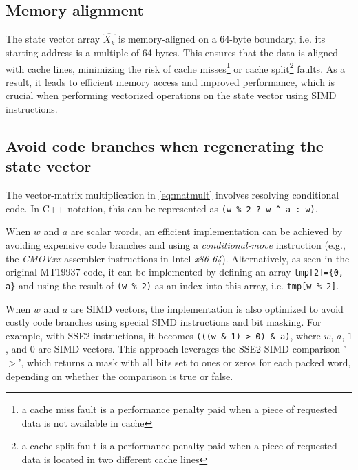 \documentclass[preprint,1p,times]{elsarticle}
\begin{document}
\subsection{Memory alignment}
The state vector array $\hat{X_k}$ is memory-aligned on a 64-byte boundary, i.e. its starting address is a multiple of 64 bytes. This ensures that the data is aligned with cache lines, minimizing the risk of cache misses\footnote{a cache miss fault is a performance penalty paid when a piece of requested data is not available in cache} or cache split\footnote{a cache split fault is a performance penalty paid when a piece of requested data is located in two different cache lines} faults. As a result, it leads to efficient memory access and improved performance, which is  crucial when performing vectorized operations on the state vector using SIMD instructions.

\subsection{Avoid code branches when regenerating the state vector}
The vector-matrix multiplication in \eqref{eq:matmult} involves resolving conditional code. In C++ notation, this can be represented as \lstinline{(w % 2 ? w ^ a : w)}.

When $w$ and $a$ are scalar words, an efficient implementation can be achieved by avoiding expensive code branches and using a \textit{conditional-move} instruction (e.g., the \textit{CMOVxx} assembler instructions in Intel \textit{x86-64}). Alternatively, as seen in the original MT19937 code, it can be implemented by defining an array \lstinline|tmp[2]={0, a}| and using the result of \lstinline{(w % 2)} as an index into this array, i.e. \lstinline{tmp[w % 2]}.

When $w$ and $a$ are SIMD vectors, the implementation is also optimized to avoid costly code branches using special SIMD instructions and bit masking. For example, with SSE2 instructions, it becomes \lstinline{(((w & 1) > 0) & a)}, where $w$, $a$, $1$, and $0$ are SIMD vectors. This approach leverages the SSE2 SIMD comparison '$>$', which returns a mask with all bits set to ones or zeros for each packed word, depending on whether the comparison is true or false.
\end{document}
